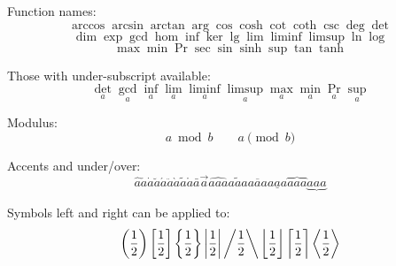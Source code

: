 Function names:
\begin{dmath}[compact,spread={1.250000\baselineskip}] \arccos \arcsin \arctan \arg \cos \cosh \cot \coth \csc \deg \det  \end{dmath}
\begin{dmath}[compact,spread={1.250000\baselineskip}] \dim \exp \gcd \hom \inf \ker \lg \lim \liminf \limsup \ln \log  \end{dmath}
\begin{dmath}[compact,spread={1.250000\baselineskip}] \max \min \Pr \sec \sin \sinh \sup \tan \tanh \end{dmath}

Those with under-subscript available:
\begin{dmath}[compact,spread={1.250000\baselineskip}] \det_{a} \gcd_{a} \inf_{a} \lim_{a} \liminf_{a} \limsup_{a} \max_{a} \min_{a} \Pr_{a} \sup_{a} \end{dmath}

Modulus:
\begin{dmath}[compact,spread={1.250000\baselineskip}] a \bmod b \qquad a \pmod{b} \end{dmath}

Accents and under/over:
\begin{dmath}[compact,spread={1.250000\baselineskip}] \hat{a} \check{a} \dot{a} \breve{a} \acute{a} \ddot{a} \grave{a} \tilde{a} \mathring{a} \bar{a} \vec{a} \widehat{aaa} \widetilde{aaa} \overline{aaa} \underline{aaa} \overbrace{aaa} \underbrace{aaa} \end{dmath}

Symbols left and right can be applied to:
\begin{dmath}[compact,spread={1.250000\baselineskip}] \left( \frac{1}{2} \right) \left[ \frac{1}{2} \right] \left\{ \frac{1}{2} \right\} \left| \frac{1}{2} \right| \left/ \frac{1}{2} \right\backslash \left\lfloor \frac{1}{2} \right\rfloor \left\lceil \frac{1}{2} \right\rceil \left\langle \frac{1}{2} \right\rangle    \end{dmath}

